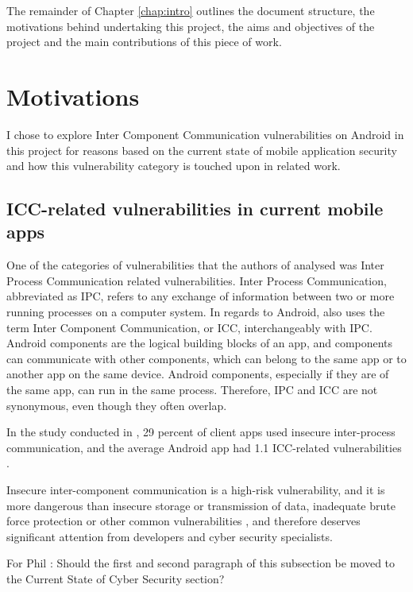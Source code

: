 		The remainder of Chapter \ref{chap:intro} outlines the document structure, the motivations behind undertaking this project, the aims and objectives of the project and the main contributions of this piece of work.
		
	\section{Motivations}
	    \label{sec:intro_motivations}
	    
	    I chose to explore Inter Component Communication vulnerabilities on Android in this project for reasons based on the current state of mobile application security and how this vulnerability category is touched upon in related work.
	    
	    \subsection{ICC-related vulnerabilities in current mobile apps}
	    
    	One of the categories of vulnerabilities that the authors of \cite{pt_mobile_apps_2019} analysed was Inter Process Communication related vulnerabilities. Inter Process Communication, abbreviated as IPC, refers to any exchange of information between two or more running processes on a computer system. In regards to Android, \cite{pt_mobile_apps_2019} also uses the term Inter Component Communication, or ICC, interchangeably with IPC. Android components are the logical building blocks of an app, and components can communicate with other components, which can belong to the same app or to another app on the same device. Android components, especially if they are of the same app, can run in the same process. Therefore, IPC and ICC are not synonymous, even though they often overlap.
    	
    	In the study conducted in \cite{pt_mobile_apps_2019}, 29 percent of client apps used insecure inter-process communication, and the average Android app had 1.1 ICC-related vulnerabilities \cite{pt_mobile_apps_2019}.
    	
    	Insecure inter-component communication is a high-risk vulnerability, and it is more dangerous than insecure storage or transmission of data, inadequate brute force protection or other common vulnerabilities \cite{pt_mobile_apps_2019}, and therefore deserves significant attention from developers and cyber security specialists.
		
		For Phil : Should the first and second paragraph of this subsection be moved to the Current State of Cyber Security section? 
		
